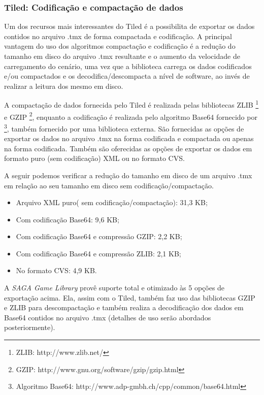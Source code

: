 \subsubsection{Tiled: Codificação e compactação de dados}
%
%
Um dos recursos mais interessantes do Tiled é a possibilita de exportar os dados contidos no arquivo .tmx de forma compactada e codificação. A principal vantagem do uso dos algoritmos compactação e codificação é a redução do tamanho em disco do arquivo .tmx resultante e o aumento da velocidade de carregamento do cenário, uma vez que a biblioteca carrega os dados codificados e/ou compactados e os decodifica/descompacta a nível de software, ao invés de realizar a leitura dos mesmo em disco. 
\par 
A compactação de dados fornecida pelo Tiled é realizada pelas bibliotecas ZLIB \footnote{ZLIB: http://www.zlib.net/} e GZIP \footnote{GZIP: http://www.gnu.org/software/gzip/gzip.html}, enquanto a codificação é realizada pelo algoritmo Base64 fornecido por \footnote{Algoritmo Base64: http://www.adp-gmbh.ch/cpp/common/base64.html}, também fornecido por uma biblioteca externa. São fornecidas as opções de exportar os dados no arquivo .tmx na forma codificada e compactada ou apenas na forma codificada. Também são oferecidas as opções de exportar os dados em formato puro (sem codificação) XML ou no formato CVS. 
\par 
A seguir podemos verificar a redução do tamanho em disco de um arquivo .tmx em relação ao seu tamanho em disco sem codificação/compactação.
%
\begin{itemize}
 \item Arquivo XML puro( sem codificação/compactação): 31,3 KB;
 \item Com codificação Base64: 9,6 KB;
 \item Com codificação Base64 e compressão GZIP: 2,2 KB;
 \item Com codificação Base64 e compressão ZLIB: 2,1 KB;
 \item No formato CVS: 4,9 KB.
\end{itemize}
%
A \textit{SAGA Game Library} provê suporte total e otimizado às 5 opções de exportação acima. Ela, assim com o Tiled, também faz uso das bibliotecas GZIP e ZLIB para descompactação e também realiza a decodificação dos dados em Base64 contidos no arquivo .tmx (detalhes de uso serão abordados posteriormente).
%
%
%
%
